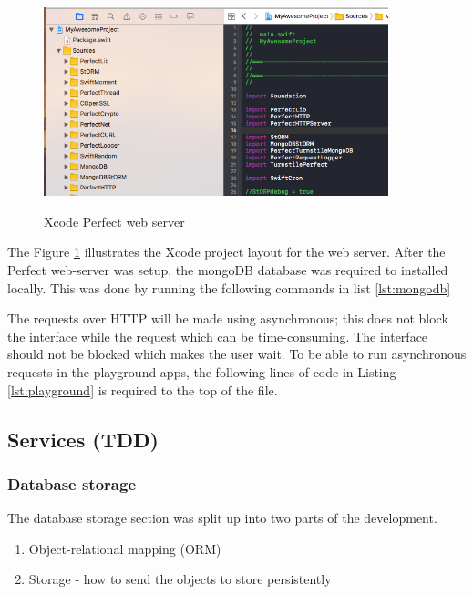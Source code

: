 \begin{figure}[!h]
    \caption{Xcode Perfect web server}
    \centering
    \includegraphics[width=100mm]{images/xcode_server}
    \label{fig:xcode_server}
\end{figure}

The Figure \ref{fig:xcode_server} illustrates the Xcode project layout for the web server. After the Perfect web-server was setup, the mongoDB database was required to installed locally. This was done by running the following commands in list \ref{lst:mongodb}






The requests over HTTP will be made using asynchronous; this does not block the interface while the request which can be time-consuming. The interface should not be blocked which makes the user wait. To be able to run asynchronous requests in the playground apps, the following lines of code in Listing \ref{lst:playground} is required to the top of the file.

\subsection{Services (TDD)}

\subsubsection{Database storage}

The database storage section was split up into two parts of the development. 

\begin{enumerate}
  \item Object-relational mapping (ORM)
  \item Storage - how to send the objects to store persistently
\end{enumerate}

